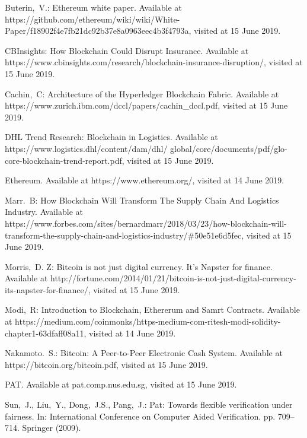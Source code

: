 \documentclass{KERauth}
\begin{document}
\begin{thebibliography}
\item Buterin,~V.: Ethereum white paper. Available at https://github.com/ethereum/wiki/wiki/White-Paper/f18902f4e7fb21dc92b37e8a0963eec4b3f4793a, visited at 15 June 2019.

\item CBInsights: How Blockchain Could Disrupt Insurance. Available at https://www.cbinsights.com/research/blockchain-insurance-disruption/, visited at 15 June 2019.

\item Cachin,~C: Architecture of the Hyperledger Blockchain Fabric. Available at https://www.zurich.ibm.com/dccl/papers/cachin\_dccl.pdf, visited at 15 June 2019.

\item DHL Trend Research: Blockchain in Logistics. Available at https://www.logistics.dhl/content/dam/dhl/
global/core/documents/pdf/glo-core-blockchain-trend-report.pdf, visited at 15 June 2019.

\item Ethereum. Available at https://www.ethereum.org/, visited at 14 June 2019.

\item Marr.~B: How Blockchain Will Transform The Supply Chain And Logistics Industry. Available at https://www.forbes.com/sites/bernardmarr/2018/03/23/how-blockchain-will-transform-the-supply-chain-and-logistics-industry/\#50e51e6d5fec, visited at 15 June 2019.

\item Morris,~D. Z: Bitcoin is not just digital currency. It's Napster for finance. Available at http://fortune.com/2014/01/21/bitcoin-is-not-just-digital-currency-its-napster-for-finance/, visited at 15 June 2019.

\item Modi,~R: Introduction to Blockchain, Ethererum and Samrt Contracts. Available at https://medium.com/coinmonks/https-medium-com-ritesh-modi-solidity-chapter1-63dfaff08a11, visited at 14 June 2019.
\item Nakamoto.~S.: Bitcoin: A Peer-to-Peer Electronic Cash System. Available at https://bitcoin.org/bitcoin.pdf, visited at 15 June 2019.

\item PAT. Available at pat.comp.nus.edu.sg, visited at 15 June 2019.

\item Sun,~J., Liu,~Y., Dong,~J.S., Pang,~J.: Pat: Towards flexible verification under
fairness. In: International Conference on Computer Aided Verification. pp. 709–
714. Springer (2009).


\end{thebibliography}
\end{document}
